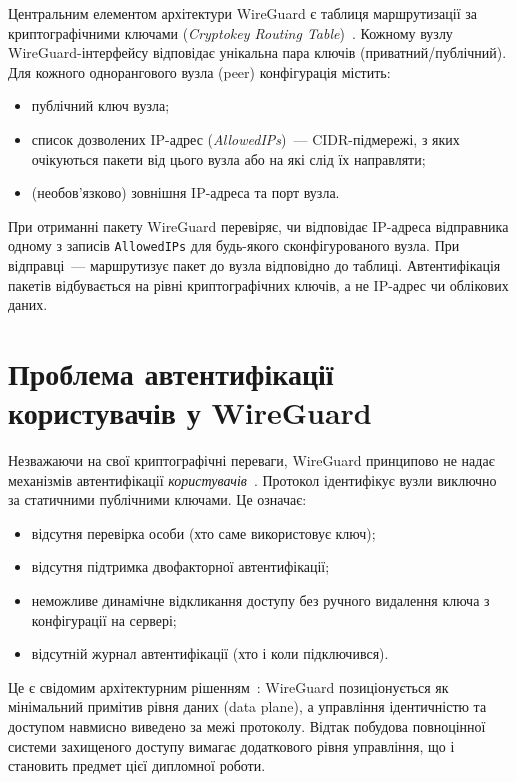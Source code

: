 Центральним елементом архітектури WireGuard є таблиця маршрутизації за
криптографічними ключами (\textit{Cryptokey Routing Table})~\cite{donenfeld2017wireguard}.
Кожному вузлу WireGuard-інтерфейсу відповідає унікальна пара ключів
(приватний/публічний). Для кожного однорангового вузла (peer) конфігурація
містить:
\begin{itemize}
  \item публічний ключ вузла;
  \item список дозволених IP-адрес (\textit{AllowedIPs})~--- CIDR-підмережі,
        з яких очікуються пакети від цього вузла або на які слід їх направляти;
  \item (необов'язково) зовнішня IP-адреса та порт вузла.
\end{itemize}

При отриманні пакету WireGuard перевіряє, чи відповідає IP-адреса відправника
одному з записів \texttt{AllowedIPs} для будь-якого сконфігурованого вузла.
При відправці~--- маршрутизує пакет до вузла відповідно до таблиці.
Автентифікація пакетів відбувається на рівні криптографічних ключів,
а не IP-адрес чи облікових даних.

\section{Проблема автентифікації користувачів у WireGuard}

Незважаючи на свої криптографічні переваги, WireGuard принципово не надає
механізмів автентифікації \textit{користувачів}~\cite{donenfeld2017wireguard, wireguard_limitations}.
Протокол ідентифікує вузли виключно за статичними публічними ключами. Це означає:

\begin{itemize}
  \item відсутня перевірка особи (хто саме використовує ключ);
  \item відсутня підтримка двофакторної автентифікації;
  \item неможливе динамічне відкликання доступу без ручного видалення ключа
        з конфігурації на сервері;
  \item відсутній журнал автентифікації (хто і коли підключився).
\end{itemize}

Це є свідомим архітектурним рішенням~\cite{donenfeld2017wireguard, wireguard_limitations}: WireGuard
позиціонується як мінімальний примітив рівня даних (data plane), а управління
ідентичністю та доступом навмисно виведено за межі протоколу. Відтак
побудова повноцінної системи захищеного доступу вимагає додаткового рівня
управління, що і становить предмет цієї дипломної роботи.

